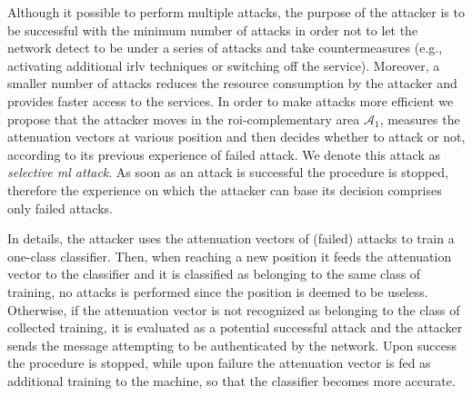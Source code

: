 \documentclass[draftcls,onecolumn,12pt]{IEEEtran}
\begin{document}


Although it possible to perform multiple attacks, the purpose of the attacker is to be successful with the minimum number of attacks in order not to let the network detect to be under a series of attacks and take countermeasures (e.g., activating additional \ac{irlv} techniques or switching off the service). Moreover, a smaller number of attacks reduces the resource consumption by the attacker and provides faster access to the services. In order to make attacks more efficient we propose that the attacker moves in the \ac{roi}-complementary area $\mathcal A_1$, measures the attenuation vectors at various position and then decides whether to attack or not, according to its previous experience of failed attack. We denote this attack as {\em selective \ac{ml} attack}. As soon as an attack is successful the procedure is stopped, therefore the experience on which the attacker can base its decision comprises only failed attacks.

In details, the attacker uses the attenuation vectors of (failed) attacks to train a one-class classifier. Then, when reaching a new position it feeds the attenuation vector to the classifier and it is classified as belonging to the same class of training, no attacks is performed since the position is deemed to be useless. Otherwise, if the attenuation vector is not recognized as belonging to the class of collected training, it is evaluated as a potential successful attack and the attacker sends the message attempting to be authenticated by the network. Upon success the procedure is stopped, while upon failure the attenuation vector is fed as additional training to the machine, so that the classifier becomes more accurate.  

\end{document}
